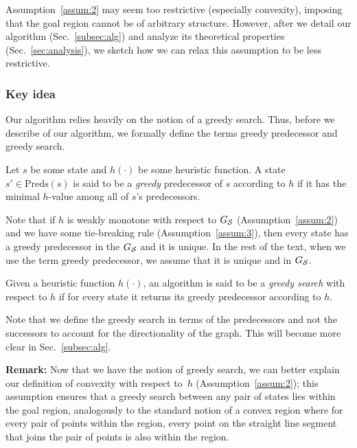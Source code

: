 \documentclass[a4paper,10pt]{article}
\begin{document}
Assumption~\ref{assum:2} may seem too restrictive (especially convexity), imposing that the goal region cannot be of arbitrary structure. However, after we detail our algorithm (Sec.~\ref{subsec:alg}) and analyze its theoretical properties (Sec.~\ref{sec:analysis}), we sketch how we can relax this assumption to be less restrictive.


 
\subsubsection{Key idea}
\label{sec:key}
Our algorithm relies heavily on the notion of a greedy search.  Thus, before we describe of our algorithm, we formally define the terms greedy predecessor and greedy search.

\vspace{2mm}
\begin{definition}
\label{def:greedy-suc}
  Let $s$ be some state and $h(\cdot)$ be some heuristic function.
  A state $s' \in \text{Preds}(s)$ is said to be a \emph{greedy} predecessor of $s$ according to $h$ if it has the minimal $h$-value among all of $s$'s predecessors.
\end{definition}
Note that 
if $h$ is weakly monotone with respect to $G_\mathcal{S}$
(Assumption~\ref{assum:2}) 
and we have some tie-breaking rule
(Assumption~\ref{assum:3}), then every state has a greedy predecessor in the $G_\mathcal{S}$ and it is unique.
In the rest of the text, when we use the term greedy predecessor, we assume that it is unique and in $G_\mathcal{S}$.

\vspace{2mm}
\begin{definition}
  Given a heuristic function $h(\cdot)$,
  an algorithm is said to be a \emph{greedy search}  with respect to $h$ if for every state it returns its greedy predecessor according to $h$.
\end{definition}
Note that we define the greedy search in terms of the predecessors and not the successors to account for the directionality of the graph. This will become more clear in Sec.~\ref{subsec:alg}.

\textbf{Remark:} Now that we have the notion of greedy search, we can better explain our definition of convexity with respect to~$h$ (Assumption~\ref{assum:2});
this assumption ensures that a greedy search between any pair of states lies within the goal region, analogously to the standard notion of a convex region where for every pair of points within the region, every point on the straight line segment that joins the pair of points is also within the region.
\end{document}
